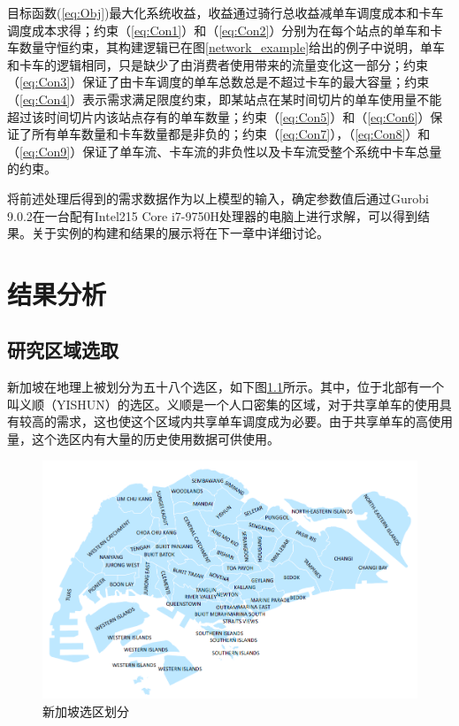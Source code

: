 \documentclass[]{tongjithesis}
\numberwithin{equation}{chapter}
\begin{document}
目标函数(\ref{eq:Obj})最大化系统收益，收益通过骑行总收益减单车调度成本和卡车调度成本求得；约束（\ref{eq:Con1}）和（\ref{eq:Con2}）分别为在每个站点的单车和卡车数量守恒约束，其构建逻辑已在图\ref{network_example}给出的例子中说明，单车和卡车的逻辑相同，只是缺少了由消费者使用带来的流量变化这一部分；约束（\ref{eq:Con3}）保证了由卡车调度的单车总数总是不超过卡车的最大容量；约束（\ref{eq:Con4}）表示需求满足限度约束，即某站点在某时间切片的单车使用量不能超过该时间切片内该站点存有的单车数量；约束（\ref{eq:Con5}）和（\ref{eq:Con6}）保证了所有单车数量和卡车数量都是非负的；约束（\ref{eq:Con7}），（\ref{eq:Con8}）和（\ref{eq:Con9}）保证了单车流、卡车流的非负性以及卡车流受整个系统中卡车总量的约束。

将前述处理后得到的需求数据作为以上模型的输入，确定参数值后通过Gurobi 9.0.2\cite{gurobi2018gurobi}在一台配有Intel215 Core i7-9750H处理器的电脑上进行求解，可以得到结果。关于实例的构建和结果的展示将在下一章中详细讨论。


\clearpage

\chapter{结果分析}
\section{研究区域选取}
新加坡在地理上被划分为五十八个选区，如下图\ref{regions}所示。其中，位于北部有一个叫义顺（YISHUN）的选区。义顺是一个人口密集的区域，对于共享单车的使用具有较高的需求，这也使这个区域内共享单车调度成为必要。由于共享单车的高使用量，这个选区内有大量的历史使用数据可供使用。
\begin{figure}[H]
	\centering
	\includegraphics[width= 0.9 \textwidth]{figures_main/regions.png}
	\caption{新加坡选区划分}
	\label{regions}
\end{figure}
\end{document}

